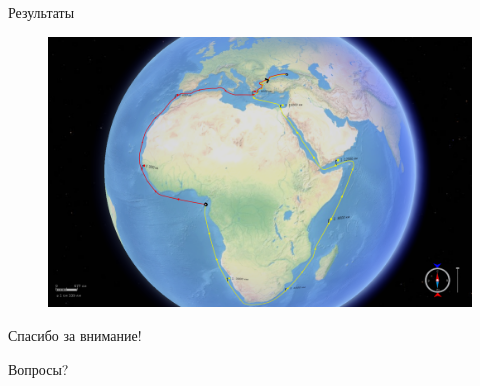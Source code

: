 \documentclass[russian, hyperref={unicode}]{beamer}
\theoremstyle{definition}
\begin{document}
\begin{frame}{Результаты}
     {
        \begin{figure}
            \includegraphics[width=\textwidth]{results/3}
        \end{figure}
    }

\end{frame}

\begin{frame}{Спасибо за внимание!}
    \begin{center}
        \Huge
        {\color{blue} Вопросы?}
    \end{center}
\end{frame}
\end{document}
